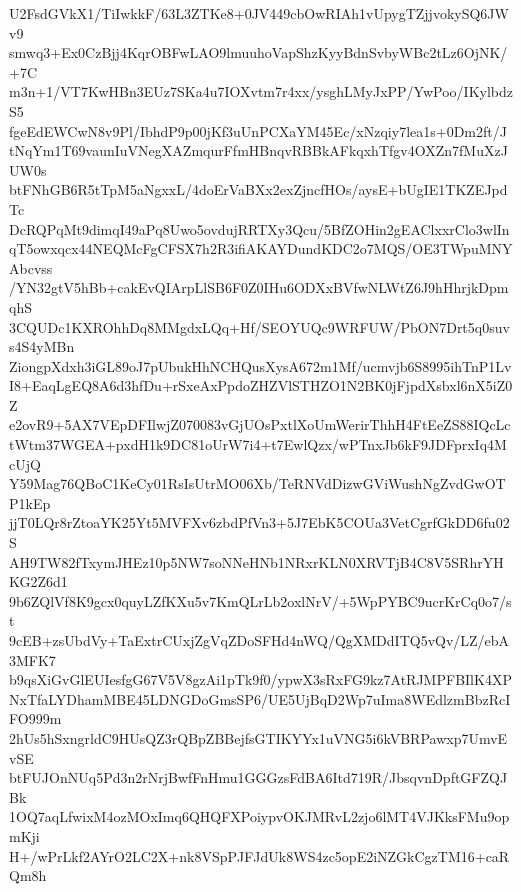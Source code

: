 U2FsdGVkX1/TiIwkkF/63L3ZTKe8+0JV449cbOwRIAh1vUpygTZjjvokySQ6JWv9
smwq3+Ex0CzBjj4KqrOBFwLAO9lmuuhoVapShzKyyBdnSvbyWBc2tLz6OjNK/+7C
m3n+1/VT7KwHBn3EUz7SKa4u7IOXvtm7r4xx/ysghLMyJxPP/YwPoo/IKylbdzS5
fgeEdEWCwN8v9Pl/IbhdP9p00jKf3uUnPCXaYM45Ec/xNzqiy7lea1s+0Dm2ft/J
tNqYm1T69vaunIuVNegXAZmqurFfmHBnqvRBBkAFkqxhTfgv4OXZn7fMuXzJUW0s
btFNhGB6R5tTpM5aNgxxL/4doErVaBXx2exZjncfHOs/aysE+bUgIE1TKZEJpdTc
DcRQPqMt9dimqI49aPq8Uwo5ovdujRRTXy3Qcu/5BfZOHin2gEAClxxrClo3wlIn
qT5owxqcx44NEQMcFgCFSX7h2R3ifiAKAYDundKDC2o7MQS/OE3TWpuMNYAbcvss
/YN32gtV5hBb+cakEvQIArpLlSB6F0Z0IHu6ODXxBVfwNLWtZ6J9hHhrjkDpmqhS
3CQUDc1KXROhhDq8MMgdxLQq+Hf/SEOYUQc9WRFUW/PbON7Drt5q0suvs4S4yMBn
ZiongpXdxh3iGL89oJ7pUbukHhNCHQusXysA672m1Mf/ucmvjb6S8995ihTnP1Lv
I8+EaqLgEQ8A6d3hfDu+rSxeAxPpdoZHZVlSTHZO1N2BK0jFjpdXsbxl6nX5iZ0Z
e2ovR9+5AX7VEpDFIlwjZ070083vGjUOsPxtlXoUmWerirThhH4FtEeZS88IQcLc
tWtm37WGEA+pxdH1k9DC81oUrW7i4+t7EwlQzx/wPTnxJb6kF9JDFprxIq4McUjQ
Y59Mag76QBoC1KeCy01RsIsUtrMO06Xb/TeRNVdDizwGViWushNgZvdGwOTP1kEp
jjT0LQr8rZtoaYK25Yt5MVFXv6zbdPfVn3+5J7EbK5COUa3VetCgrfGkDD6fu02S
AH9TW82fTxymJHEz10p5NW7soNNeHNb1NRxrKLN0XRVTjB4C8V5SRhrYHKG2Z6d1
9b6ZQlVf8K9gcx0quyLZfKXu5v7KmQLrLb2oxlNrV/+5WpPYBC9ucrKrCq0o7/st
9cEB+zsUbdVy+TaExtrCUxjZgVqZDoSFHd4nWQ/QgXMDdITQ5vQv/LZ/ebA3MFK7
b9qsXiGvGlEUIesfgG67V5V8gzAi1pTk9f0/ypwX3sRxFG9kz7AtRJMPFBIlK4XP
NxTfaLYDhamMBE45LDNGDoGmsSP6/UE5UjBqD2Wp7uIma8WEdlzmBbzRcIFO999m
2hUs5hSxngrldC9HUsQZ3rQBpZBBejfsGTIKYYx1uVNG5i6kVBRPawxp7UmvEvSE
btFUJOnNUq5Pd3n2rNrjBwfFnHmu1GGGzsFdBA6Itd719R/JbsqvnDpftGFZQJBk
1OQ7aqLfwixM4ozMOxImq6QHQFXPoiypvOKJMRvL2zjo6lMT4VJKksFMu9opmKji
H+/wPrLkf2AYrO2LC2X+nk8VSpPJFJdUk8WS4zc5opE2iNZGkCgzTM16+caRQm8h
